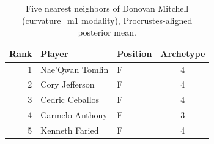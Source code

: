 \begin{table}[htbp]
  \centering\small
  \begin{tabular}{rllc}
    \toprule
    Rank & Player & Position & Archetype \\
    \midrule
    1 & Nae'Qwan Tomlin & F & 4 \\
    2 & Cory Jefferson & F & 4 \\
    3 & Cedric Ceballos & F & 4 \\
    4 & Carmelo Anthony & F & 3 \\
    5 & Kenneth Faried & F & 4 \\
    \bottomrule
  \end{tabular}
  \caption{Five nearest neighbors of Donovan Mitchell (curvature_m1 modality), Procrustes-aligned posterior mean.}
  \label{tab:Donovan_Mitchell_neighbors_curvature_m1}
\end{table}

